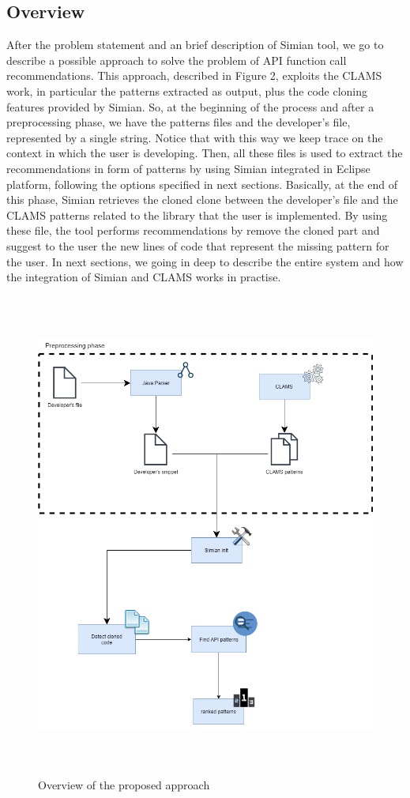 
\subsection{Overview}
After the problem statement and an brief description of Simian tool, we go to describe a possible approach to solve the problem of API function call recommendations. This approach, described in Figure 2, exploits the CLAMS work, in particular the patterns extracted as output, plus the code cloning features provided by Simian. So, at the beginning of the process and after a preprocessing phase, we have the patterns files and the developer's file, represented by a single string. Notice that with this way we keep trace on the context in which the user is developing. Then, all these files is used to extract the recommendations in form of patterns by using Simian integrated in Eclipse platform, following the options specified in next sections. Basically, at the end of this phase, Simian retrieves the cloned clone between the developer's file and the CLAMS patterns related to the library that the user is implemented. By using these file, the tool performs recommendations by remove the cloned part and suggest to the user the new lines of code that represent the missing pattern for the user. In next sections, we going in deep to describe the entire system and how the integration of Simian and CLAMS works in practise. 


\begin{figure}[H]
\includegraphics[width=14cm,height=16cm,keepaspectratio]{images/simian.png}
\centering
\caption{Overview of the proposed approach}
\label{fig:cmd}
\end{figure}

